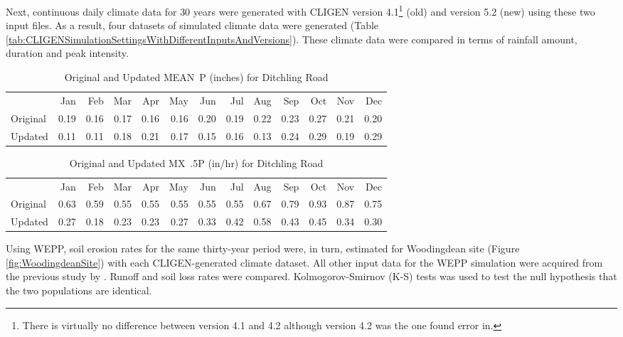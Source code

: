Next, continuous daily climate data for 30 years were generated with CLIGEN
version 4.1\footnote{There is virtually no difference between version 4.1 and
4.2 although version 4.2 was the one \citet{yu2000-301} found error in.} (old)
and version 5.2 (new) using these two input files. As a result, four datasets of
simulated climate data were generated (Table
\ref{tab:CLIGENSimulationSettingsWithDifferentInputsAndVersions}). These climate
data were compared in terms of rainfall amount, duration and peak intensity.

\begin{table}[htbp]
  \centering
  \caption[Original and Updated MEAN~P for Ditchling Road]{Original and
Updated MEAN~P (inches) for Ditchling Road}
  \label{tab:UpdatedMEANPForDitchlingRoad}
    \footnotesize
    \begin{tabular}{lrrrrrrrrrrrr}
    \toprule
     & Jan & Feb & Mar & Apr & May & Jun & Jul & Aug & Sep & Oct &
Nov & Dec\\
    \cmidrule{2-13}
    Original & 0.19 & 0.16 & 0.17 & 0.16 & 0.16 & 0.20 & 0.19 & 0.22
& 0.23 & 0.27 & 0.21 & 0.20\\
    Updated & 0.11 & 0.11 & 0.18 & 0.21 & 0.17 & 0.15 & 0.16 & 0.13
& 0.24 & 0.29 & 0.19 & 0.29\\
    \bottomrule
    \end{tabular}
\end{table}

\begin{table}[htbp]
  \centering
  \caption[Original and Updated MX~.5P for Ditchling Road]{Original and
Updated MX~.5P (in/hr) for Ditchling Road}
  \label{tab:UpdatedMX5PForDitchlingRoad}
    \footnotesize
    \begin{tabular}{lrrrrrrrrrrrr}
    \toprule
     & Jan & Feb & Mar & Apr & May & Jun & Jul & Aug & Sep & Oct &
Nov & Dec\\
    \cmidrule{2-13}
    Original & 0.63 & 0.59 & 0.55 & 0.55 & 0.55 & 0.55 & 0.55 & 0.67
& 0.79 & 0.93 & 0.87 & 0.75\\
    Updated & 0.27 & 0.18 & 0.23 & 0.23 & 0.27 & 0.33 & 0.42 & 0.58
& 0.43 & 0.45 & 0.34 & 0.30\\
    \bottomrule
    \end{tabular}
\end{table}

Using WEPP, soil erosion rates for the same thirty-year period were, in turn,
estimated for Woodingdean site (Figure \ref{fig:WoodingdeanSite}) with each
CLIGEN-generated climate dataset. All other input data for the WEPP simulation
were acquired from the previous study by \citet{favis-mortlock1998-141}. Runoff
and soil loss rates were compared.
Kolmogorov-Smirnov (K-S) tests was used to test the null hypothesis that the two
populations are identical.


